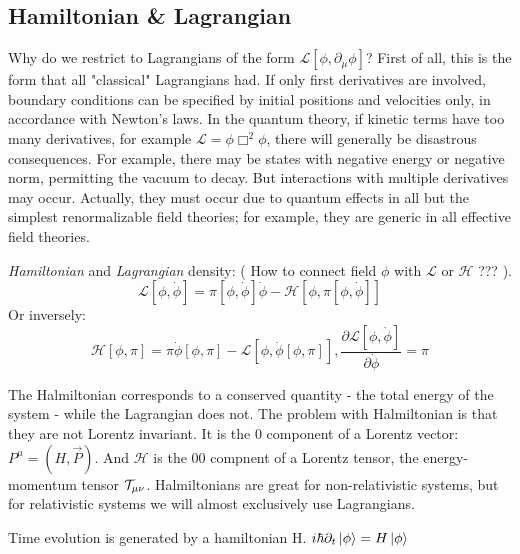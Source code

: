 \subsection{Hamiltonian \& Lagrangian}
Why do we restrict to Lagrangians of the form $\mathcal{L}[\phi,
\partial_\mu \phi]$? First of all, this is the form that all "classical" 
Lagrangians had. If only first derivatives are involved, boundary 
conditions can be specified by initial positions and velocities only, in
accordance with Newton's laws. In the quantum theory, if kinetic terms 
have too many derivatives, for example $\mathcal{L} = \phi\Box^2\phi$, 
there will generally be disastrous consequences. For example, there may be
states with negative energy or negative norm, permitting the vacuum to decay. 
But interactions with multiple derivatives may occur. Actually, they must
occur due to quantum effects in all but the simplest renormalizable field
theories; for example, they are generic in all effective field theories.

\emph{Hamiltonian} and \emph{Lagrangian} density: ( How to connect field
$\phi$ with $\mathcal{L}$ or $\mathcal{H}$ ??? ).
\[ \mathcal{L}[\phi,\dot{\phi}] = \pi[\phi, \dot{\phi}]\dot{\phi} -
\mathcal{H}[\phi, \pi[\phi, \dot{\phi}]]  \]
Or inversely:
\[ \mathcal{H}[\phi,\pi] = \pi\dot{\phi}[\phi, \pi] -
\mathcal{L}[\phi, \dot{\phi}[\phi, \pi]],   
\frac{\partial \mathcal{L}[\phi, \dot{\phi}]}{\partial \dot{\phi} } = \pi\]

The Halmiltonian corresponds to a conserved quantity - the total energy of
the system - while the Lagrangian does not. The problem with Halmiltonian is
that they are not Lorentz invariant. It is the 0 component of a Lorentz
vector: $P^\mu = (H, \vec{P})$. And $\mathcal{H}$ is the 00 compnent of a
Lorentz tensor, the energy-momentum tensor $\mathcal{T}_{\mu\nu}$. Halmiltonians
are great for non-relativistic systems, but for relativistic systems we will
almost exclusively use Lagrangians.

Time evolution is generated by a hamiltonian H.
$i\hbar\partial_{t}\ket{\phi} = H\ket{\phi}$

